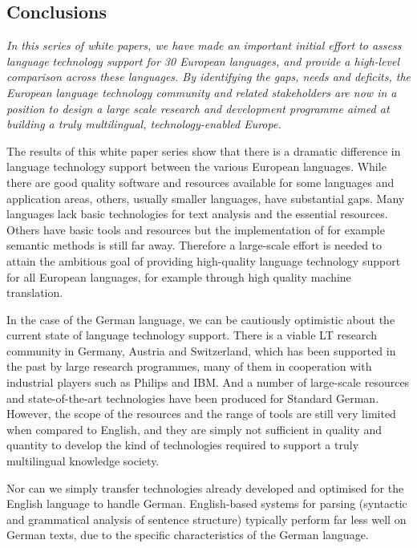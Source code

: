 \documentclass[]{../../metanetpaper}
\begin{document}
\begin{multicols}{2}
\subsection{Conclusions}

\emph{In this series of white papers, we have made an important initial effort to assess language technology support for 30 European languages, and provide a high-level comparison across these languages. By identifying the gaps, needs and deficits, the European language technology community and related stakeholders are now in a position to design a large scale research and development programme aimed at building a truly multilingual, technology-enabled Europe.}

The results of this white paper series show that there is a dramatic difference in language technology support between the various European languages. While there are good quality software and resources available for some languages and application areas, others, usually smaller languages, have substantial gaps. Many languages lack basic technologies for text analysis and the essential resources. Others have basic tools and resources but the implementation of for example semantic methods is still far away. Therefore a large-scale effort is needed to attain the ambitious goal of providing high-quality language technology support for all European languages, for example through high quality machine translation. 

In the case of the German language, we can be cautiously optimistic about the current state of language technology support. There is a viable LT research community in Germany, Austria and Switzerland, which has been supported in the past by large research programmes, many of them in cooperation with industrial players such as Philips and IBM. And a number of large-scale resources and state-of-the-art technologies have been produced for Standard German. However, the scope of the resources and the range of tools are still very limited when compared to English, and they are simply not sufficient in quality and quantity to develop the kind of technologies required to support a truly multilingual knowledge society.

Nor can we simply transfer technologies already developed and optimised for the English language to handle German. English-based systems for parsing (syntactic and grammatical analysis of sentence structure) typically perform far less well on German texts, due to the specific characteristics of the German language.


\end{multicols}
\end{document}
